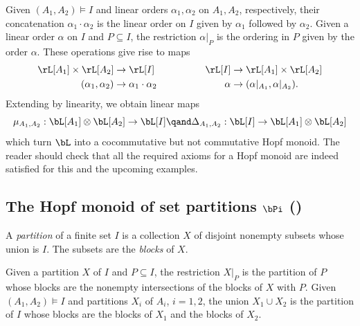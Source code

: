 Given $(A_1,A_2)\models I$
and linear orders $\alpha_1,\alpha_2$ on $A_1,A_2$, respectively,
their concatenation $\alpha_1\cdot \alpha_2$ 
is the linear order on $I$ given by $\alpha_1$ followed by $\alpha_2$.
Given a linear order $\alpha$ on $I$ and $P\subseteq I$, the restriction 
 $\alpha|_P$ is the ordering in $P$ given by the order $\alpha$.
These operations give rise to maps
\begin{equation}\label{e:L}
\begin{aligned}
\rL[A_1]\times\rL[A_2] & \to \rL[I] &\qquad\qquad \rL[I] & \to \rL[A_1]\times\rL[A_2]\\
(\alpha_1,\alpha_2) & \to \alpha_1\cdot\alpha_2
& \alpha & \to (\alpha |_{A_1},\alpha |_{A_2}).
\end{aligned}
\end{equation}
Extending by linearity, we obtain linear maps
\[
 \mu_{A_1,A_2}:\bL[A_1]\otimes\bL[A_2] \to \bL[I]
 \qand
\Delta_{A_1,A_2}:\bL[I]\to \bL[A_1]\otimes\bL[A_2]
\]
which turn $\bL$ into a cocommutative but not commutative Hopf monoid. The reader should check that all the required axioms for a Hopf monoid are indeed satisfied for this and the upcoming examples.


\subsection{The Hopf monoid of set partitions \texorpdfstring{$\bPi$ (\cite{AM:2010})}{pi ([4])} }\label{ss:partition}

A \emph{partition} of a finite set $I$ is a collection $X$ of disjoint nonempty subsets whose union is $I$. The subsets are the \emph{blocks} of $X$.

Given a partition $X$ of $I$ and $P\subseteq I$, the restriction
$X|_P$ is the partition of $P$ whose blocks are 
the nonempty intersections of the blocks of $X$ with $P$.
Given $(A_1,A_2)\models I$
and partitions $X_i$ of $A_i$, $i=1,2$, 
the union $X_1\cup X_2$ is the partition of $I$ 
whose blocks are the blocks of $X_1$ and the blocks of $X_2$.

